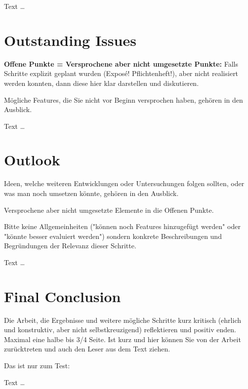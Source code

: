 \documentclass[11pt,a4paper,english]{scrreprt}
\newenvironment{comment}
  {\par\medskip
   \begingroup\color{olive}%
   }
 {\endgroup
  \medskip}
\begin{document}
Text \dots

\section{Outstanding Issues}
\begin{comment}
\textbf{Offene Punkte = Versprochene aber nicht umgesetzte Punkte:} Falls Schritte explizit geplant wurden (Exposé! Pflichtenheft!), aber nicht realisiert werden konnten, dann diese hier klar darstellen und diskutieren.

Mögliche Features, die Sie nicht vor Beginn versprochen haben, gehören in den Ausblick.
\end{comment}

Text \dots

\section{Outlook}
\begin{comment}
Ideen, welche weiteren Entwicklungen oder Untersuchungen folgen sollten, oder was man noch umsetzen könnte, gehören in den Ausblick.

Versprochene aber nicht umgesetzte Elemente in die Offenen Punkte.

Bitte keine Allgemeinheiten ("können noch Features hinzugefügt werden" oder "könnte besser evaluiert werden") sondern konkrete Beschreibungen und Begründungen der Relevanz dieser Schritte.
\end{comment}

Text \dots

\section{Final Conclusion}
\begin{comment}
Die Arbeit, die Ergebnisse und weitere mögliche Schritte kurz kritisch (ehrlich und konstruktiv, aber nicht selbstkreuzigend) reflektieren und positiv enden. Maximal eine halbe bis 3/4 Seite.
Ist kurz und hier können Sie von der Arbeit zurücktreten und auch den Leser aus dem Text ziehen.

Das ist nur zum Test: \textcite{ford} \textcite{hadoop}
\end{comment}

Text \dots

\clearpage

\end{document}
